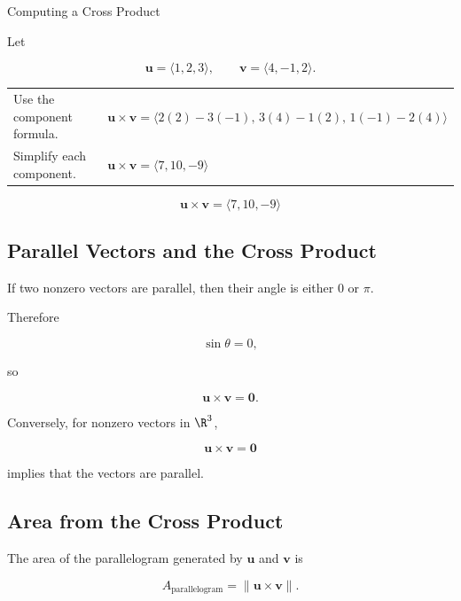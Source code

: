 \begin{workedexamplebox}{Computing a Cross Product}

Let

\[ \mathbf{u}=\langle1,2,3\rangle,\qquad
\mathbf{v}=\langle4,-1,2\rangle. \]

\begin{tabularx}{\textwidth}{@{}>{\raggedright\arraybackslash}p{}X@{}}
Use the component formula. &
\(\mathbf{u}\times\mathbf{v}
=\langle2(2)-3(-1),\,3(4)-1(2),\,1(-1)-2(4)\rangle\)\\
Simplify each component. &
\(\mathbf{u}\times\mathbf{v}=\langle7,10,-9\rangle\)
\end{tabularx}

\begin{answerbox}
\[ \boxed{\mathbf{u}\times\mathbf{v}=\langle7,10,-9\rangle} \]
\end{answerbox}
\end{workedexamplebox}

\subsection{Parallel Vectors and the Cross Product}
\label{subsec:parallel-vectors-cross-product}

If two nonzero vectors are parallel, then their angle is either \(0\) or
\(\pi\).

Therefore

\[ \sin\theta=0, \]

so

\[ \boxed{\mathbf{u}\times\mathbf{v}=\mathbf{0}.} \]

Conversely, for nonzero vectors in \(\R^3\),

\[
\mathbf{u}\times\mathbf{v}=\mathbf{0}
\]

implies that the vectors are parallel.

\subsection{Area from the Cross Product}
\label{subsec:area-cross-product}

The area of the parallelogram generated by \(\mathbf{u}\) and
\(\mathbf{v}\) is

\[
\boxed{
A_{\text{parallelogram}}
=
\|\mathbf{u}\times\mathbf{v}\|.
}
\]

